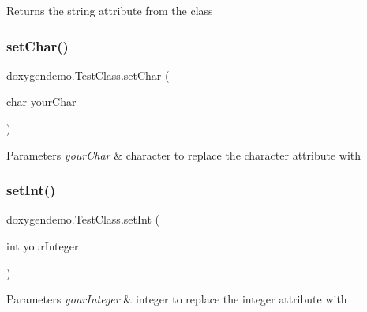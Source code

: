 \begin{DoxyReturn}{Returns}
the string attribute from the class 
\end{DoxyReturn}
\mbox{\label{classdoxygendemo_1_1_test_class_a8a38375f77528de05eee5adfe614560f}} 
\subsubsection{\texorpdfstring{set\+Char()}{setChar()}}
{\footnotesize\ttfamily doxygendemo.\+Test\+Class.\+set\+Char (\begin{DoxyParamCaption}\item[{char}]{your\+Char }\end{DoxyParamCaption})}


\begin{DoxyParams}{Parameters}
{\em your\+Char} & character to replace the character attribute with \\
\hline
\end{DoxyParams}
\mbox{\label{classdoxygendemo_1_1_test_class_ac478dea45796d1b1dc1acf230c8d4263}} 
\subsubsection{\texorpdfstring{set\+Int()}{setInt()}}
{\footnotesize\ttfamily doxygendemo.\+Test\+Class.\+set\+Int (\begin{DoxyParamCaption}\item[{int}]{your\+Integer }\end{DoxyParamCaption})}


\begin{DoxyParams}{Parameters}
{\em your\+Integer} & integer to replace the integer attribute with \\
\hline
\end{DoxyParams}
\mbox{\label{classdoxygendemo_1_1_test_class_a0da9db140c2b9cad94632c4a2f8a1081}} 
